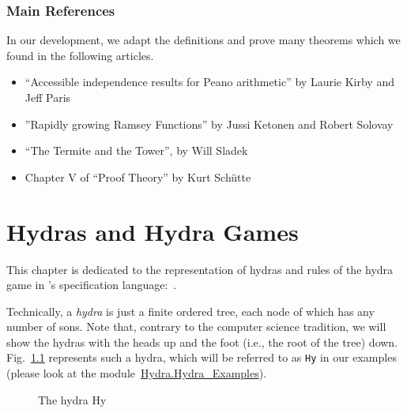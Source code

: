 \subsection*{Main References}

In our development, we adapt the definitions and prove many theorems which
we found in the following articles. 
\begin{itemize}
\item ``Accessible independence results for Peano arithmetic''  by Laurie Kirby and Jeff Paris~\cite{KP82}
\item ''Rapidly growing Ramsey Functions'' by Jussi Ketonen and Robert Solovay~\cite{KS81}
\item ``The Termite and the Tower'', by Will Sladek~\cite{Sladek07thetermite}
\item Chapter V of ``Proof Theory'' by Kurt Schütte~\cite{schutte}
\end{itemize}






\chapter{Hydras and Hydra Games}

\label{sec:orgheadline91}





This chapter is dedicated to the representation of hydras and rules of the hydra game in \coq's specification language:~\gallina. 

Technically, a \emph{hydra} is just a finite ordered tree, each node of which 
has any number of sons. Note that, contrary to the computer science tradition, we will show the hydras 
with the heads up and the foot (i.e., the root of the tree) down.
Fig.~\ref{fig:Hy} represents such  a hydra, which will be referred to as \texttt{Hy} in our examples (please look at the 
module~\href{../theories/html/hydras.Hydra.Hydra_Examples.html}{Hydra.Hydra\_Examples}). 

\begin{figure}[h]
\centering
{}
\caption{The hydra Hy \label{fig:Hy}}
\end{figure}



